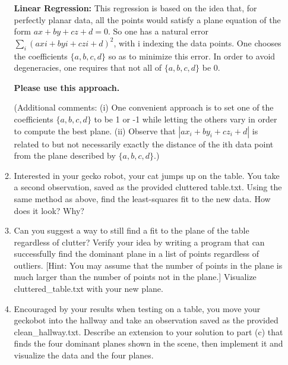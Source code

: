 \documentclass[conference,onecolumn]{IEEEtran}
\begin{document}
\begin{enumerate}[label=\arabic{enumi}.]
\begin{enumerate}
                        \textbf{Linear Regression:} This regression is based on the idea that, for perfectly planar data, all the points would satisfy a plane equation of the form $ax + by + cz + d = 0$.
                        So one has a natural error $\sum_i (axi + byi + czi + d)^2$, with i indexing the data points.
                        One chooses the coefficients $\{a, b, c, d\}$ so as to minimize this error.
                        In order to avoid degeneracies, one requires that not all of $\{a, b, c, d\}$ be 0.

                        \textbf{Please use this approach.}

                        (Additional comments: (i) One convenient approach is to set one of the coefficients $\{a, b, c, d\}$ to be 1 or -1 while letting the others vary in order to compute the best plane.
                        (ii) Observe that $|ax_i + by_i + cz_i + d|$ is related to but not necessarily exactly the distance of the ith data point from the plane described by $\{a, b, c, d\}$.)
                  \item Interested in your gecko robot, your cat jumps up on the table.
                        You take a second observation, saved as the provided cluttered table.txt.
                        Using the same method as above, find the least-squares fit to the new data.
                        How does it look? Why?
                  \item Can you suggest a way to still find a fit to the plane of the table regardless of clutter?
                        Verify your idea by writing a program that can successfully find the dominant plane in a list of points regardless of outliers.
                              [Hint: You may assume that the number of points in the plane is much larger than the number of points not in the plane.]
                        Visualize cluttered\_table.txt with your new plane.
                  \item Encouraged by your results when testing on a table, you move your geckobot into the hallway and take an observation saved as the provided clean\_hallway.txt.
                        Describe an extension to your solution to part (c) that finds the four dominant planes shown in the scene, then implement it and visualize the data and the four planes.


\end{enumerate}
\end{enumerate}
\end{document}
